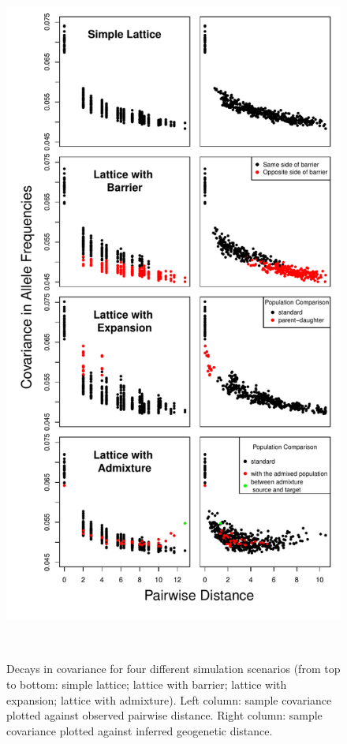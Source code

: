 \documentclass[12pt]{article}
\begin{document}
\begin{figure}
	\centering
		{\includegraphics[width=4.8in,height=8.8in]{figs/sims/sim_covariance_decays.pdf}}
		\caption{Decays in covariance for four different simulation scenarios (from top to bottom: simple lattice; lattice with barrier; lattice with expansion; lattice with admixture).  Left column: sample covariance plotted against observed pairwise distance.  Right column: sample covariance plotted against inferred geogenetic distance.}
	\label{sfig:sim_covariance_decays}
\end{figure}
\end{document}
